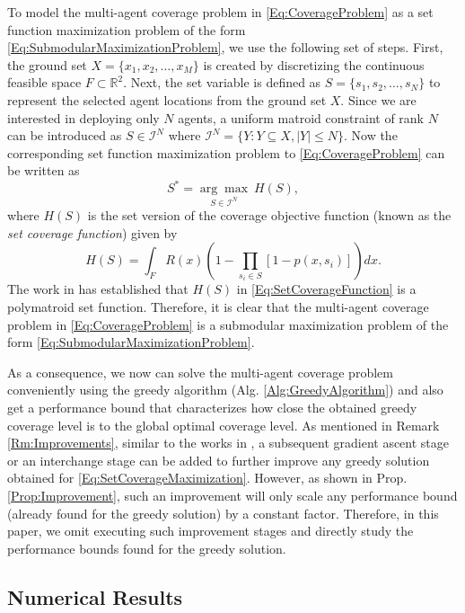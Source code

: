 \documentclass[conference]{IEEEtran}
\newcommand{\R}{\mathbb{R}}
\begin{document}
To model the multi-agent coverage problem in \eqref{Eq:CoverageProblem} as a set function maximization problem of the form \eqref{Eq:SubmodularMaximizationProblem}, we use the following set of steps. First, the ground set $X=\{x_1,x_2,\ldots,x_M\}$ is created by discretizing the continuous feasible space $F \subset \R^2$. Next, the set variable is defined as $S = \{s_1,s_2,\ldots,s_N\}$ to represent the selected agent locations from the ground set $X$. Since we are interested in deploying only $N$ agents, a uniform matroid constraint of rank $N$ can be introduced as $S\in\mathcal{I}^N$ where $\mathcal{I}^N = \{Y:Y \subseteq X, \vert Y \vert \leq N\}$. Now the corresponding set function maximization problem to \eqref{Eq:CoverageProblem} can be written as 
\begin{equation}\label{Eq:SetCoverageMaximization}
    S^* = \underset{S\in\mathcal{I}^N}{\arg\max}\ H(S),
\end{equation}
where $H(S)$ is the set version of the coverage objective function (known as the \emph{set coverage function}) given by
\begin{equation}\label{Eq:SetCoverageFunction}
    H(S) = \int_F R(x)(1-\prod_{s_i \in S} \left[1-p(x,s_i)\right])dx.
\end{equation}
The work in \cite{Sun2019} has established that $H(S)$ in \eqref{Eq:SetCoverageFunction} is a polymatroid set function. Therefore, it is clear that the multi-agent coverage problem in \eqref{Eq:CoverageProblem} is a submodular maximization problem of the form \eqref{Eq:SubmodularMaximizationProblem}. 

As a consequence, we now can solve the multi-agent coverage problem conveniently using the greedy algorithm (Alg. \ref{Alg:GreedyAlgorithm}) and also get a performance bound that characterizes how close the obtained greedy coverage level is to the global optimal coverage level. As mentioned in Remark \ref{Rm:Improvements}, similar to the works in \cite{Sun2019,Sun2020}, a subsequent gradient ascent stage or an interchange stage can be added to further improve any greedy solution obtained for \eqref{Eq:SetCoverageMaximization}. However, as shown in Prop. \ref{Prop:Improvement}, such an improvement will only scale any performance bound (already found for the greedy solution) by a constant factor. Therefore, in this paper, we omit executing such improvement stages and directly study the performance bounds found for the greedy solution. 


\subsection{Numerical Results}
\end{document}
